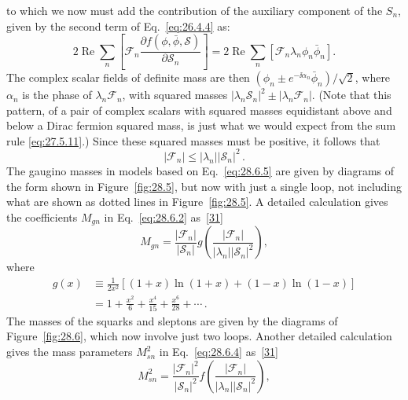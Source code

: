 to which we now must add the contribution of the auxiliary component of
the \(S_n\), given by the second term of Eq.~\eqref{eq:26.4.4} as:
\[
  2\operatorname{Re}\sum_n
  \left[
    \mathcal{F}_n
    \frac{\partial f(\phi,\bar\phi,\mathcal{S})}
         {\partial\mathcal{S}_n}
  \right]
  =2\operatorname{Re}\sum_n
  \left[\mathcal{F}_n\lambda_n\phi_n\bar\phi_n\right].
\]
The complex scalar fields of definite mass are then
\((\phi_n\pm e^{-\ii\alpha_n}\bar\phi_n)/\sqrt{2}\), where \(\alpha_n\) is
the phase of \(\lambda_n\mathcal{F}_n\), with squared masses
\(\lvert\lambda_n\mathcal{S}_n\rvert^2
\mathbin{\pm}\lvert\lambda_n\mathcal{F}_n\rvert\). (Note that this
pattern, of a pair of complex scalars with squared masses equidistant above
and below a Dirac fermion squared mass, is just what we would expect
from the sum rule \eqref{eq:27.5.11}.) Since these squared masses must be
positive, it follows that
\begin{equation}
  \lvert\mathcal{F}_n\rvert
  \leq\lvert\lambda_n\rvert\lvert\mathcal{S}_n\rvert^2\,.
  \tag{28.6.6}\label{eq:28.6.6}
\end{equation}
The gaugino masses in models based on Eq.~\eqref{eq:28.6.5} are given by
diagrams of the form shown in Figure~\ref{fig:28.5}, but now with just a
single loop, not including what are shown as dotted lines in
Figure~\ref{fig:28.5}. A detailed calculation gives the coefficients
\(M_{gn}\) in Eq.~\eqref{eq:28.6.2}
as~\hyperref[ch28-ref-31]{[31]}
\begin{equation}
  M_{gn}
  =\frac{\lvert\mathcal{F}_n\rvert}{\lvert\mathcal{S}_n\rvert}
  g\left(
    \frac{\lvert\mathcal{F}_n\rvert}
         {\lvert\lambda_n\rvert\lvert\mathcal{S}_n\rvert^2}
  \right),
  \tag{28.6.7}\label{eq:28.6.7}
\end{equation}
where
\begin{equation}
  \begin{aligned}
    g(x)
      &\equiv\frac{1}{2x^2}
      \left[(1+x)\ln(1+x)+(1-x)\ln(1-x)\right]\\
      &=1+\frac{x^2}{6}+\frac{x^4}{15}+\frac{x^6}{28}+\cdots\,.
  \end{aligned}
  \tag{28.6.8}\label{eq:28.6.8}
\end{equation}
The masses of the squarks and sleptons are given by the diagrams of
Figure~\ref{fig:28.6}, which now involve just two loops. Another detailed
calculation gives the mass parameters \(M_{sn}^2\) in
Eq.~\eqref{eq:28.6.4} as~\hyperref[ch28-ref-31]{[31]}
\begin{equation}
  M_{sn}^2
  =\frac{\lvert\mathcal{F}_n\rvert^2}
         {\lvert\mathcal{S}_n\rvert^2}
  f\left(
    \frac{\lvert\mathcal{F}_n\rvert}
         {\lvert\lambda_n\rvert\lvert\mathcal{S}_n\rvert^2}
  \right),
  \tag{28.6.9}\label{eq:28.6.9}
\end{equation}
